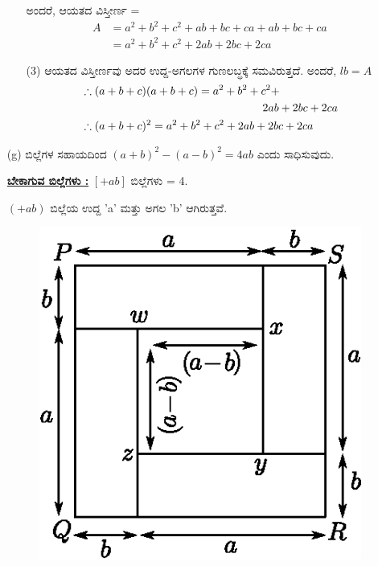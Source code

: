 \begin{enumerate}
\begin{itemize}
ಅಂದರೆ, ಆಯತದ ವಿಸ್ತೀರ್ಣ =
\begin{align*}
A & = a^2 + b^2 + c^2 + ab + bc + ca + ab + bc + ca\\
& = a^2 + b^2 + c^2 + 2ab + 2bc + 2ca
\end{align*}

\item[(3)] ಆಯತದ ವಿಸ್ತೀರ್ಣವು ಅದರ ಉದ್ದ-ಅಗಲಗಳ ಗುಣಲಬ್ಧಕ್ಕೆ ಸಮವಿರುತ್ತದೆ. 
ಅಂದರೆ, $lb = A$
\begin{align*}
& \therefore (a+b+c)(a+b+c) = a^2 + b^2 + c^2 +\\
& \hspace{5.7cm} 2ab + 2bc + 2ca\\
& \therefore (a + b + c)^2 = a^2 + b^2 + c^2 + 2ab + 2bc + 2ca
\end{align*}

\end{itemize}

\item[(g)] ಬಿಲ್ಲೆಗಳ ಸಹಾಯದಿಂದ $(a+b)^2 - (a-b)^2 = 4ab$ ಎಂದು ಸಾಧಿಸುವುದು. 


\noindent
{\textbf{\underline{ಬೇಕಾಗುವ ಬಿಲ್ಲೆಗಳು :}}} $[+ab]$ ಬಿಲ್ಲೆಗಳು = 4. 

$(+ab)$ ಬಿಲ್ಲೆಯ ಉದ್ದ 'a' ಮತ್ತು ಅಗಲ 'b' ಆಗಿರುತ್ತವೆ.
\begin{figure}[H]
\centering
\includegraphics[scale=0.8]{src/figure/chap3/fig3-33.eps}
\end{figure}


\end{enumerate}
